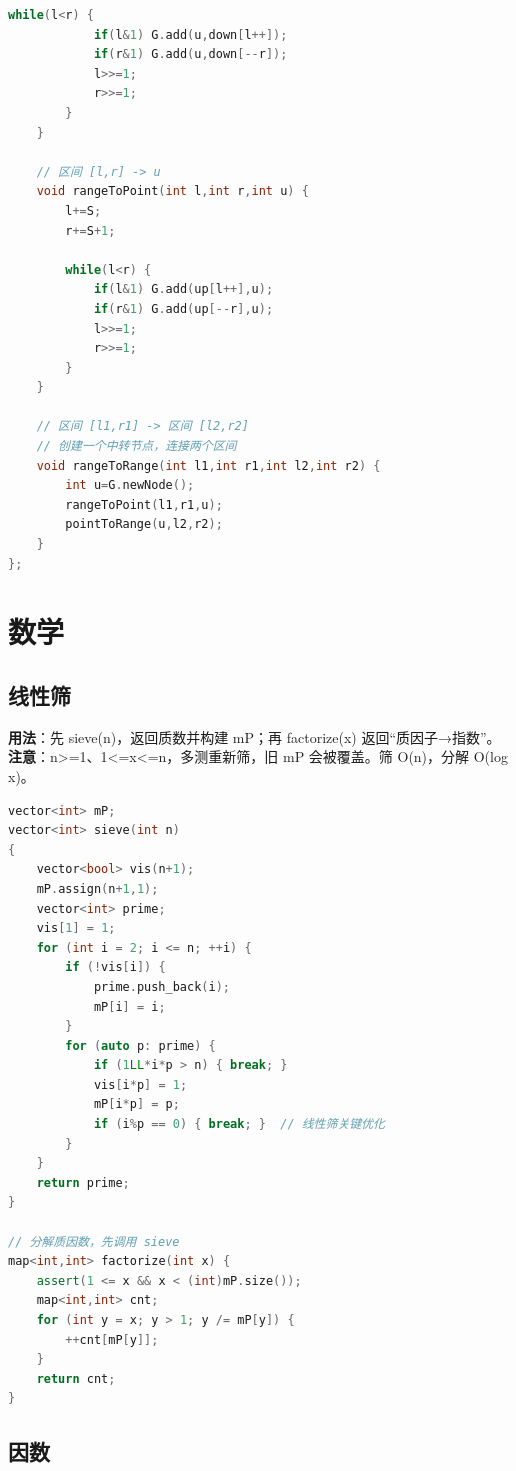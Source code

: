 \documentclass[a4paper,9pt]{extarticle}
\begin{document}
\begin{lstlisting}[language={C++}]
        while(l<r) {
            if(l&1) G.add(u,down[l++]);
            if(r&1) G.add(u,down[--r]);
            l>>=1;
            r>>=1;
        }
    }

    // 区间 [l,r] -> u
    void rangeToPoint(int l,int r,int u) {
        l+=S;
        r+=S+1;

        while(l<r) {
            if(l&1) G.add(up[l++],u);
            if(r&1) G.add(up[--r],u);
            l>>=1;
            r>>=1;
        }
    }

    // 区间 [l1,r1] -> 区间 [l2,r2]
    // 创建一个中转节点，连接两个区间
    void rangeToRange(int l1,int r1,int l2,int r2) {
        int u=G.newNode();
        rangeToPoint(l1,r1,u);
        pointToRange(u,l2,r2);
    }
};
\end{lstlisting}
\section{数学}

\subsection{线性筛}

\textbf{用法}：先 sieve(\allowbreak{}n)，返回质数并构建 mP；再 factorize(x) 返回“质因子→指数”。\textbf{注意}：n>\allowbreak{}=\allowbreak{}1、1<\allowbreak{}=\allowbreak{}x<\allowbreak{}=\allowbreak{}n，多测重新筛，旧 mP 会被覆盖。筛 O(n)，分解 O(log x)。

\begin{lstlisting}[language={C++}]
vector<int> mP;
vector<int> sieve(int n)
{
	vector<bool> vis(n+1);
    mP.assign(n+1,1);
	vector<int> prime;
	vis[1] = 1;
	for (int i = 2; i <= n; ++i) {
		if (!vis[i]) {
            prime.push_back(i); 
            mP[i] = i;
        }
		for (auto p: prime) {
			if (1LL*i*p > n) { break; }
			vis[i*p] = 1;
            mP[i*p] = p;
			if (i%p == 0) { break; }  // 线性筛关键优化
		}
	}
	return prime;
}

// 分解质因数，先调用 sieve
map<int,int> factorize(int x) {
    assert(1 <= x && x < (int)mP.size());
    map<int,int> cnt;
    for (int y = x; y > 1; y /= mP[y]) {
        ++cnt[mP[y]];
    }
    return cnt;
}
\end{lstlisting}

\subsection{因数}
\end{document}
